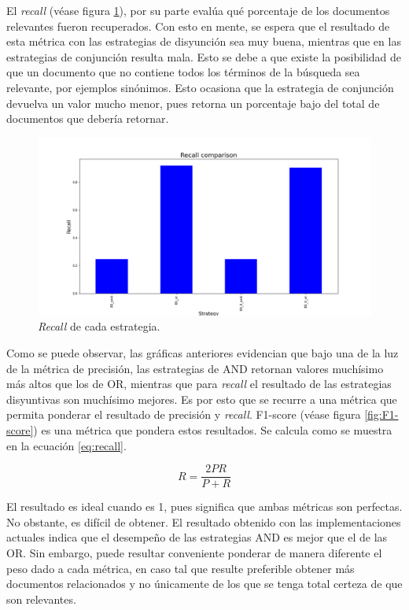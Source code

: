 El \textit{recall} (véase figura \ref{fig:Recall}), por su parte evalúa qué porcentaje de los documentos relevantes fueron recuperados. Con esto en mente, se espera que el resultado de esta métrica con las estrategias de disyunción sea muy buena, mientras que en las estrategias de conjunción resulta mala. Esto se debe a que existe la posibilidad de que un documento que no contiene todos los términos de la búsqueda sea relevante, por ejemplos sinónimos. Esto ocasiona que la estrategia de conjunción devuelva un valor mucho menor, pues retorna un porcentaje bajo del total de documentos que debería retornar.\\

\begin{figure}
    \centering
    \includegraphics[width=\textwidth]{results/images/BS_recall_comparison.png}
    \caption{\textit{Recall} de cada estrategia.}
    \label{fig:Recall}
\end{figure}

Como se puede observar, las gráficas anteriores evidencian que bajo una de la luz de la métrica de precisión, las estrategias de AND retornan valores muchísimo más altos que los de OR, mientras que para \textit{recall} el resultado de las estrategias disyuntivas son muchísimo mejores. Es por esto que se recurre a una métrica que permita ponderar el resultado de precisión y \textit{recall}. F1-score (véase figura \ref{fig:F1-score}) es una métrica que pondera estos resultados. Se calcula como se muestra en la ecuación \ref{eq:recall}. 

\begin{equation}
    R = \frac{2PR}{P+R}
    \label{eq:recall}
\end{equation}

El resultado es ideal cuando es 1, pues significa que ambas métricas son perfectas. No obstante, es difícil de obtener. El resultado obtenido con las implementaciones actuales indica que el desempeño de las estrategias AND es mejor que el de las OR. Sin embargo, puede resultar conveniente ponderar de manera diferente el peso dado a cada métrica, en caso tal que resulte preferible obtener más documentos relacionados y no únicamente de los que se tenga total certeza de que son relevantes.

